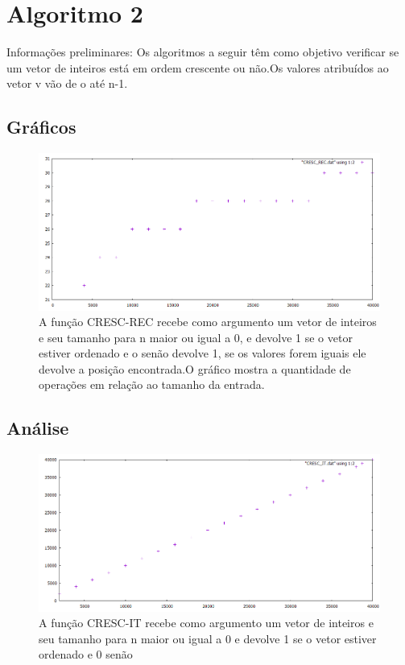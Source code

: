 \documentclass[12pt]{article}
\begin{document}
	\section{Algoritmo 2}\label{sec:CRESC}
	
	
	Informações preliminares: Os algoritmos a seguir têm como objetivo 
	verificar se um vetor de inteiros está em ordem crescente ou não.Os valores atribuídos ao vetor v vão de o até n-1.
	
	\subsection{Gráficos}
	\begin{figure}[h]
		\centering
		\includegraphics[width=0.7\linewidth]{Graficos/CRESC_REC}
		\caption[Gráfico CRESC-REC]{A função CRESC-REC recebe como argumento um vetor de inteiros e seu tamanho para n maior ou igual a 0, e devolve 1 se o vetor estiver ordenado e o senão devolve 1, se os valores forem iguais ele devolve a posição encontrada.O gráfico mostra a quantidade de operações em relação ao tamanho da entrada.}
		\label{fig:crescrec}
	\end{figure}
	
	\subsection{Análise}
	
	\begin{figure}[h]
		\centering
		\includegraphics[width=0.7\linewidth]{Graficos/CRESC_IT}
		\caption[Gráfico CRESC-IT]{A função CRESC-IT recebe como argumento um vetor de inteiros e seu tamanho para n maior ou igual a 0 e devolve 1 se o vetor estiver ordenado e 0 senão}
		\label{fig:crescit}
	\end{figure}
	
\end{document}
